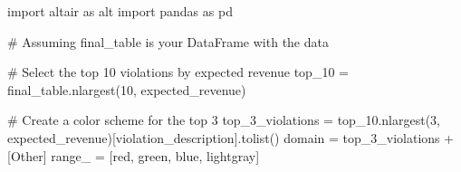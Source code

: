 \documentclass[
  letterpaper,
  DIV=11,
  numbers=noendperiod]{scrartcl}
\newenvironment{Shaded}{\begin{snugshade}}{\end{snugshade}}
\newcommand{\CommentTok}[1]{\textcolor[rgb]{0.37,0.37,0.37}{#1}}
\newcommand{\DecValTok}[1]{\textcolor[rgb]{0.68,0.00,0.00}{#1}}
\newcommand{\ImportTok}[1]{\textcolor[rgb]{0.00,0.46,0.62}{#1}}
\newcommand{\NormalTok}[1]{\textcolor[rgb]{0.00,0.23,0.31}{#1}}
\newcommand{\OperatorTok}[1]{\textcolor[rgb]{0.37,0.37,0.37}{#1}}
\newcommand{\StringTok}[1]{\textcolor[rgb]{0.13,0.47,0.30}{#1}}
\begin{document}
\begin{Shaded}
\begin{Highlighting}[]
\ImportTok{import}\NormalTok{ altair }\ImportTok{as}\NormalTok{ alt}
\ImportTok{import}\NormalTok{ pandas }\ImportTok{as}\NormalTok{ pd}

\CommentTok{\# Assuming final\_table is your DataFrame with the data}

\CommentTok{\# Select the top 10 violations by expected revenue}
\NormalTok{top\_10 }\OperatorTok{=}\NormalTok{ final\_table.nlargest(}\DecValTok{10}\NormalTok{, }\StringTok{\textquotesingle{}expected\_revenue\textquotesingle{}}\NormalTok{)}

\CommentTok{\# Create a color scheme for the top 3}
\NormalTok{top\_3\_violations }\OperatorTok{=}\NormalTok{ top\_10.nlargest(}\DecValTok{3}\NormalTok{, }\StringTok{\textquotesingle{}expected\_revenue\textquotesingle{}}\NormalTok{)[}\StringTok{\textquotesingle{}violation\_description\textquotesingle{}}\NormalTok{].tolist()}
\NormalTok{domain }\OperatorTok{=}\NormalTok{ top\_3\_violations }\OperatorTok{+}\NormalTok{ [}\StringTok{\textquotesingle{}Other\textquotesingle{}}\NormalTok{]}
\NormalTok{range\_ }\OperatorTok{=}\NormalTok{ [}\StringTok{\textquotesingle{}red\textquotesingle{}}\NormalTok{, }\StringTok{\textquotesingle{}green\textquotesingle{}}\NormalTok{, }\StringTok{\textquotesingle{}blue\textquotesingle{}}\NormalTok{, }\StringTok{\textquotesingle{}lightgray\textquotesingle{}}\NormalTok{]}


\end{Highlighting}
\end{Shaded}
\end{document}
